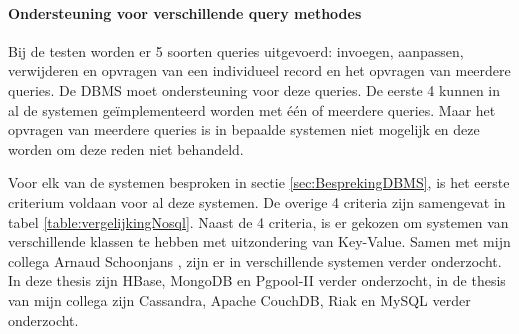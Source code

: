 \paragraph{Ondersteuning voor verschillende query methodes} Bij de testen worden er 5 soorten queries uitgevoerd: invoegen, aanpassen, verwijderen en opvragen van een individueel record en het opvragen van meerdere queries. De \gls{DBMS} moet ondersteuning voor deze queries. De eerste 4 kunnen in al de systemen geïmplementeerd worden met één of meerdere queries. Maar het opvragen van meerdere queries is in bepaalde systemen niet mogelijk en deze worden om deze reden niet behandeld. 

Voor elk van de systemen besproken in sectie \ref{sec:BesprekingDBMS}, is het eerste criterium voldaan voor al deze systemen. De overige 4 criteria zijn samengevat in tabel \ref{table:vergelijkingNosql}. Naast de 4 criteria, is er gekozen om systemen van verschillende klassen te hebben met uitzondering van Key-Value. Samen met mijn collega Arnaud Schoonjans \cite{thesisArnaud}, zijn er in verschillende systemen verder onderzocht. In deze thesis zijn  HBase, MongoDB en Pgpool-II verder onderzocht, in de thesis van mijn collega zijn Cassandra, Apache CouchDB, Riak en MySQL verder onderzocht.  
 
